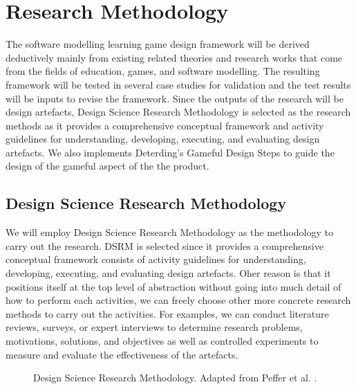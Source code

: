 \documentclass[12pt, a4paper]{report}
\begin{document}
\section{Research Methodology}
The software modelling learning game design framework will be derived deductively mainly from existing related theories and research works that come from the fields of education, games, and software modelling. The resulting framework will be tested in several case studies for validation and the test results will be inputs to revise the framework. Since the outputs of the research will be design artefacts, Design Science Research Methodology \cite{peffers2007design} is selected as the research methods as it provides a comprehensive conceptual framework and activity guidelines for understanding, developing, executing, and evaluating design artefacts. We also implements Deterding's Gameful Design Steps \cite{deterding2015lens} to guide the design of the gameful aspect of the the product.

\subsection{Design Science Research Methodology}
We will employ Design Science Research Methodology \cite{peffers2007design} as the methodology to carry out the research. DSRM is selected since it provides a comprehensive conceptual framework consists of activity guidelines for understanding, developing, executing, and evaluating design artefacts. Oher reason is that it positions itself at the top level of abstraction without going into much detail of how to perform each activities, we can freely choose other more concrete research methods to carry out the activities. For examples, we can conduct literature reviews, surveys, or expert interviews to determine research problems, motivations, solutions, and objectives as well as controlled experiments to measure and evaluate the effectiveness of the artefacts. 

\begin{figure}[ht]
\centering
{}
\caption{Design Science Research Methodology. Adapted from Peffer et al. \cite{peffers2007design}.}
\label{fig:003}
\end{figure}
\end{document}
